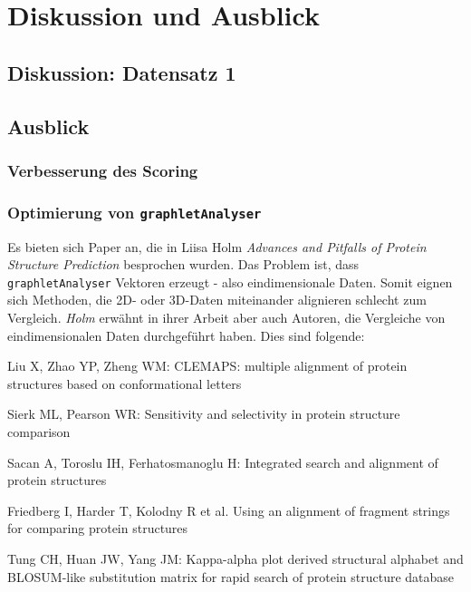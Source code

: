 \documentclass{report}
\begin{document}
\chapter{Diskussion und Ausblick}



\section{Diskussion: Datensatz 1}



\section{Ausblick}

\subsection{Verbesserung des Scoring}

\subsection{Optimierung von \texttt{graphletAnalyser}}


Es bieten sich Paper an, die in Liisa Holm \textit{Advances and Pitfalls of Protein Structure Prediction} besprochen wurden. Das Problem ist, dass \texttt{graphletAnalyser} Vektoren erzeugt - also eindimensionale Daten. Somit eignen sich Methoden, die 2D- oder 3D-Daten miteinander alignieren schlecht zum Vergleich. \textit{Holm} erw\"ahnt in ihrer Arbeit aber auch Autoren, die Vergleiche von eindimensionalen Daten durchgef\"uhrt haben. Dies sind folgende:

Liu X, Zhao YP, Zheng WM: CLEMAPS: multiple alignment of protein structures based on conformational letters

Sierk ML, Pearson WR: Sensitivity and selectivity in protein structure comparison

Sacan A, Toroslu IH, Ferhatosmanoglu H: Integrated search and alignment of protein structures

Friedberg I, Harder T, Kolodny R et al. Using an alignment of fragment strings for comparing protein structures

Tung CH, Huan JW, Yang JM: Kappa-alpha plot derived structural alphabet and BLOSUM-like substitution matrix for rapid search of protein structure database
\end{document}
